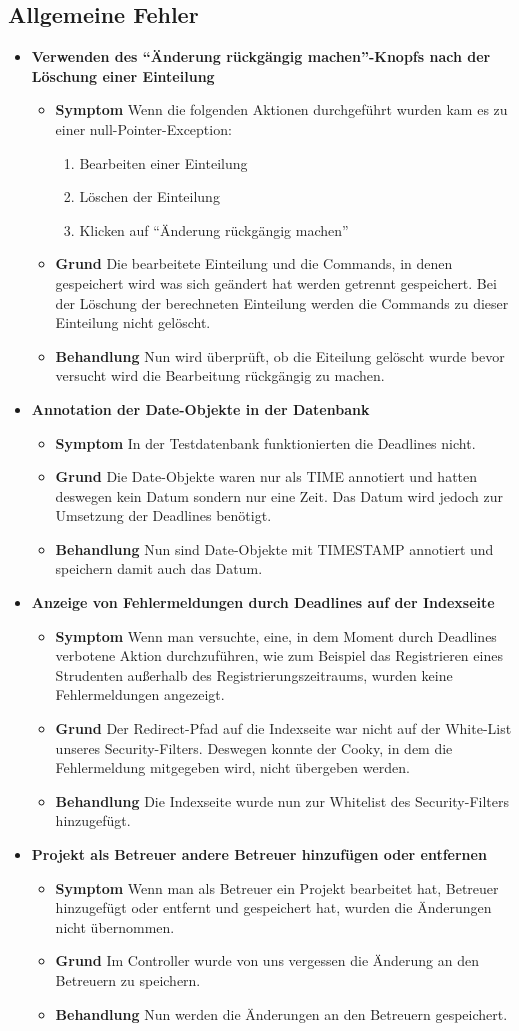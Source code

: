 \documentclass[parskip=full]{scrartcl}
\newcommand{\fehler}[4]{\textbf{#1}
 							\begin{itemize}
 							  \item \textbf{Symptom}  #2
 							  \item \textbf{Grund} #3
 							  \item \textbf{Behandlung} #4
 							\end{itemize}}
\newcommand{\code}[1]{{\ttfamily #1}}
\begin{document}
\subsection{Allgemeine Fehler}
\begin{itemize}
  \item \fehler{Verwenden des \enquote{Änderung rückgängig machen}-Knopfs nach
  der Löschung einer Einteilung }{Wenn die folgenden
  Aktionen durchgeführt wurden kam es zu einer \code{null}-Pointer-Exception:
\begin{enumerate}
  \item Bearbeiten einer Einteilung
  \item Löschen der Einteilung
  \item Klicken auf \enquote{Änderung rückgängig machen}
\end{enumerate}}{Die bearbeitete Einteilung und die Commands, in denen
gespeichert wird was sich geändert hat werden getrennt gespeichert. Bei der
Löschung der berechneten Einteilung werden die Commands zu dieser Einteilung
nicht gelöscht.}{Nun wird überprüft, ob die Eiteilung gelöscht wurde bevor
versucht wird die Bearbeitung rückgängig zu machen.}
\item \fehler{Annotation der Date-Objekte in der Datenbank }{In der %
Testdatenbank funktionierten die Deadlines nicht. }{Die Date-Objekte waren
nur als TIME annotiert und hatten deswegen kein Datum sondern nur eine Zeit.
Das Datum wird jedoch zur Umsetzung der Deadlines benötigt.}{Nun sind
Date-Objekte mit TIMESTAMP annotiert und speichern damit auch das Datum.}
\item \fehler{Anzeige von Fehlermeldungen durch Deadlines auf der
Indexseite}{Wenn man versuchte, eine, in dem Moment durch Deadlines verbotene
Aktion durchzuführen, wie zum Beispiel das Registrieren eines Strudenten
außerhalb des Registrierungszeitraums, wurden keine Fehlermeldungen
angezeigt.}{Der Redirect-Pfad auf die Indexseite war nicht auf der White-List
unseres Security-Filters. Deswegen konnte der Cooky, in dem die Fehlermeldung 
mitgegeben wird, nicht übergeben werden. }{Die Indexseite wurde nun zur
Whitelist des Security-Filters hinzugefügt.}
\item \fehler{Projekt als Betreuer andere Betreuer hinzufügen
oder entfernen}{Wenn man als Betreuer ein Projekt bearbeitet hat, Betreuer
hinzugefügt oder entfernt und gespeichert hat, wurden die Änderungen nicht übernommen.}{Im Controller
wurde von uns vergessen die Änderung an den Betreuern zu speichern.}{Nun werden die Änderungen an den Betreuern gespeichert.}

\end{itemize}
\end{document}
